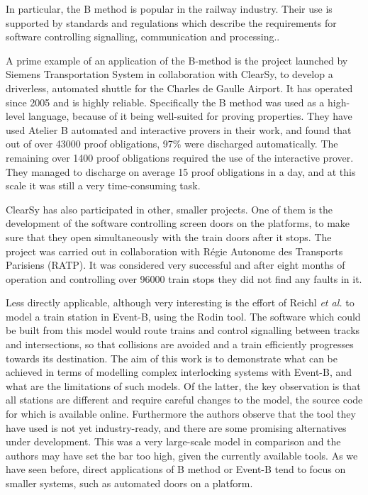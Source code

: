 \documentclass[11pt,journal]{IEEEtran}
\begin{document}
	In particular, the B method is popular in the railway industry. Their use is supported by standards and regulations which describe the requirements for software controlling signalling, communication and processing.\cite{railway standard}.
	
	A prime example of an application of the B-method is the project launched by Siemens Transportation System in collaboration with ClearSy, to develop a driverless, automated shuttle for the Charles de Gaulle Airport\cite{airport shuttle}. It has operated since 2005 and is highly reliable. Specifically the B method was used as a high-level language, because of it being well-suited for proving properties. They have used Atelier B automated and interactive provers in their work, and found that out of over 43000 proof obligations, 97\% were discharged automatically. The remaining over 1400 proof obligations required the use of the interactive prover. They managed to discharge on average 15 proof obligations in a day, and at this scale it was still a very time-consuming task. 
	
	ClearSy has also participated in other, smaller projects. One of them is the development of the software controlling screen doors on the platforms, to make sure that they open simultaneously with the train doors after it stops. The project was carried out in collaboration with R\'{e}gie Autonome des Transports Parisiens (RATP). It was considered very successful and after eight months of operation and controlling over 96000 train stops they did not find any faults in it.\cite{screen doors}
	
	Less directly applicable, although very interesting is the effort of Reichl \textit{et al.} to model a train station in Event-B, using the Rodin tool\cite{station model}. The software which could be built from this model would route trains and control signalling between tracks and intersections, so that collisions are avoided and a train efficiently progresses towards its destination. The aim of this work is to demonstrate what can be achieved in terms of modelling complex interlocking systems with Event-B, and what are the limitations of such models. Of the latter, the key observation is that all stations are different and require careful changes to the model, the source code for which is available online. Furthermore the authors observe that the tool they have used is not yet industry-ready, and there are some promising alternatives under development. This was a very large-scale model in comparison and the authors may have set the bar too high, given the currently available tools. As we have seen before, direct applications of B method or Event-B tend to focus on smaller systems, such as automated doors on a platform.
	
\end{document}
